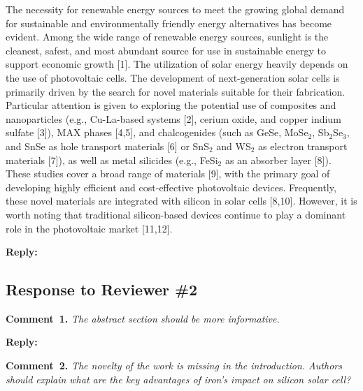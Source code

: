 \documentclass[a4paper,fleqn]{cas-sc}
\begin{document}
\begin{mdframed}
The necessity for renewable energy sources to meet the growing global demand for sustainable and environmentally friendly energy alternatives has become evident.
Among the wide range of renewable energy sources, sunlight is the cleanest, safest,
and most abundant source for use in sustainable energy to support economic growth [1].
The utilization of solar energy heavily depends on the use of photovoltaic cells.
\textcolor[rgb]{1.00,0.07,0.00}{
The development of next-generation solar cells is primarily driven by the search for novel materials suitable for their fabrication.
Particular attention is given to exploring the potential use of composites and nanoparticles
(e.g., Cu-La-based systems [2], cerium oxide, and copper indium sulfate [3]),
MAX phases [4,5],
and chalcogenides (such as GeSe, MoSe$_2$, Sb$_2$Se$_3$, and SnSe as hole transport materials [6]
or SnS$_2$ and WS$_2$ as electron transport materials [7]),
as well as metal silicides (e.g., FeSi$_2$ as an absorber layer [8]).
These studies cover a broad range of materials [9], with the primary goal of developing highly efficient and cost-effective photovoltaic devices.
Frequently, these novel materials are integrated with silicon in solar cells [8,10].
However, it is worth noting that traditional} silicon-based devices
\textcolor[rgb]{1.00,0.07,0.00}{continue} to play
\textcolor[rgb]{1.00,0.07,0.00}{a dominant role in the photovoltaic market} [11,12].
\end{mdframed}




\noindent
\textcolor[rgb]{0.51,0.00,0.00}{\textbf{Reply:}}





\subsection*{Response to Reviewer \#2 }

\noindent
\textcolor[rgb]{0.00,0.50,1.00}{\textbf{Comment~1.}}
\emph{The abstract section should be more informative.}

\noindent
\textcolor[rgb]{0.51,0.00,0.00}{\textbf{Reply:}}




\noindent
\textcolor[rgb]{0.00,0.50,1.00}{\textbf{Comment~2.}}
\emph{The novelty of the work is missing in the introduction. Authors should explain what are the key advantages of iron's impact on silicon solar cell?}
\end{document}
